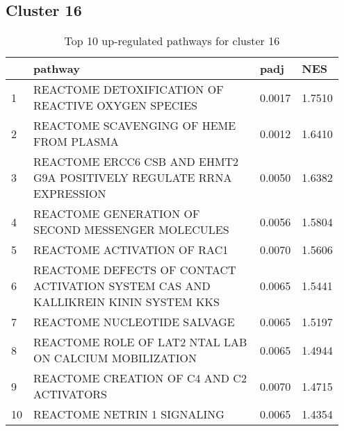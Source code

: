\documentclass{article}
\begin{document}
\subsection{Cluster 16 }
\begin{table}[H]
\centering
\begin{tabular}{p{0.05\linewidth}p{0.7\linewidth}p{0.1\linewidth}p{0.1\linewidth}}
  \hline
 & pathway & padj & NES \\ 
  \hline
1 & REACTOME DETOXIFICATION OF REACTIVE OXYGEN SPECIES & 0.0017 & 1.7510 \\ 
  2 & REACTOME SCAVENGING OF HEME FROM PLASMA & 0.0012 & 1.6410 \\ 
  3 & REACTOME ERCC6 CSB AND EHMT2 G9A POSITIVELY REGULATE RRNA EXPRESSION & 0.0050 & 1.6382 \\ 
  4 & REACTOME GENERATION OF SECOND MESSENGER MOLECULES & 0.0056 & 1.5804 \\ 
  5 & REACTOME ACTIVATION OF RAC1 & 0.0070 & 1.5606 \\ 
  6 & REACTOME DEFECTS OF CONTACT ACTIVATION SYSTEM CAS AND KALLIKREIN KININ SYSTEM KKS & 0.0065 & 1.5441 \\ 
  7 & REACTOME NUCLEOTIDE SALVAGE & 0.0065 & 1.5197 \\ 
  8 & REACTOME ROLE OF LAT2 NTAL LAB ON CALCIUM MOBILIZATION & 0.0065 & 1.4944 \\ 
  9 & REACTOME CREATION OF C4 AND C2 ACTIVATORS & 0.0070 & 1.4715 \\ 
  10 & REACTOME NETRIN 1 SIGNALING & 0.0065 & 1.4354 \\ 
   \hline
\end{tabular}
\caption{Top 10 up-regulated pathways for cluster 16} 
\label{tab:q3_2_16}
\end{table}
\end{document}
